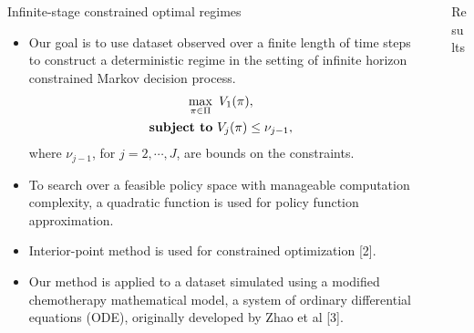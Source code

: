 \documentclass[final,hyperref={pdfpagelabels=false}]{beamer}
\begin{document}
\begin{frame}[t]
\begin{columns}[t]
\begin{column}{.465\textwidth}
\begin{block}{Infinite-stage constrained optimal regimes}
\begin{itemize}
\item Our goal is to use dataset observed over a finite length of time steps to construct a deterministic regime in the setting of infinite horizon constrained Markov decision process.
\begin{equation*}
\begin{gathered}
\max_{\pi \in \Pi}  \,\, V_1(\pi), \\ 
\text{\textbf{subject to}}  \,\, V_j({\pi}) \le \nu_{j-1},
\end{gathered}
\end{equation*}
where $\nu_{j-1}$, for $j = 2, \cdots, J$, are bounds on the constraints.
\item To search over a feasible policy space with
manageable computation complexity, a quadratic function is used for policy function approximation. 
\item Interior-point method is used for constrained optimization [2]. 
\item Our method is applied to a dataset simulated using a modified chemotherapy mathematical model, a system of ordinary differential equations (ODE), originally developed by Zhao et al [3].
\end{itemize}
\end{block}
\end{column} %

\begin{column}{.03\textwidth}\end{column} %
 
\begin{column}{.465\textwidth} %


\begin{block}{Results}


\end{block}
\end{column}
\end{columns}
\end{frame}
\end{document}
